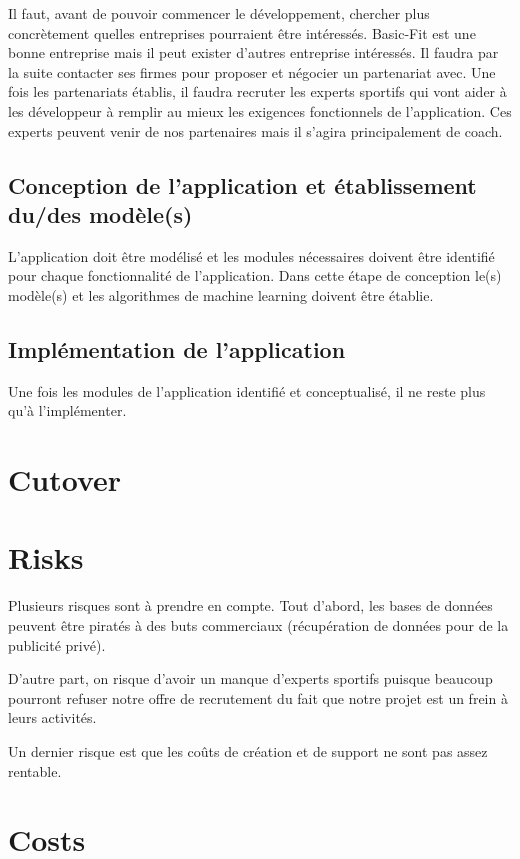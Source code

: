 Il faut, avant de pouvoir commencer le développement, chercher plus concrètement quelles entreprises pourraient être intéressés. Basic-Fit est une bonne entreprise mais il peut exister d'autres entreprise intéressés. Il faudra par la suite contacter ses firmes pour proposer et négocier un partenariat avec.
Une fois les partenariats établis, il faudra recruter les experts sportifs qui vont aider à les développeur à remplir au mieux les exigences fonctionnels de l'application. Ces experts peuvent venir de nos partenaires mais il s'agira principalement de coach. 

\subsection*{Conception de l'application et établissement du/des modèle(s)}

L'application doit être modélisé et les modules nécessaires doivent être identifié pour chaque fonctionnalité de l'application. Dans cette étape de conception le(s) modèle(s) et les algorithmes de machine learning doivent être établie. 

\subsection*{Implémentation de l'application}

Une fois les modules de l'application identifié et conceptualisé, il ne reste plus qu'à l'implémenter. 
  
\section{Cutover}

\section{Risks}

Plusieurs risques sont à prendre en compte. Tout d'abord, les bases de données peuvent être piratés à des buts commerciaux (récupération de données pour de la publicité privé). 

D'autre part, on risque d'avoir un manque d'experts sportifs puisque beaucoup pourront refuser notre offre de recrutement du fait que notre projet est un frein à leurs activités.

Un dernier risque est que les coûts de création et de support ne sont pas assez rentable.


\section{Costs}

